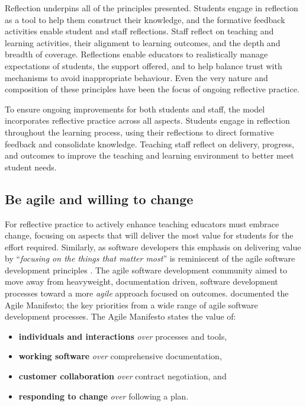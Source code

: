 Reflection underpins all of the principles presented. Students engage in reflection as a tool to help them construct their knowledge, and the formative feedback activities enable student and staff reflections. Staff reflect on teaching and learning activities, their alignment to learning outcomes, and the depth and breadth of coverage. Reflections enable educators to realistically manage expectations of students, the support offered, and to help balance trust with mechanisms to avoid inappropriate behaviour. Even the very nature and composition of these principles have been the focus of ongoing reflective practice.

To ensure ongoing improvements for both students and staff, the model incorporates reflective practice across all aspects. Students engage in reflection throughout the learning process, using their reflections to direct formative feedback and consolidate knowledge. Teaching staff reflect on delivery, progress, and outcomes to improve the teaching and learning environment to better meet student needs.



\subsection{Be agile and willing to change} %
\label{ssub:be_agile_and_willing_to_change}

For reflective practice to actively enhance teaching educators must embrace change, focusing on aspects that will deliver the most value for students for the effort required. Similarly, as software developers this emphasis on delivering value by ``\emph{focusing on the things that matter most}'' is reminiscent of the agile software development principles \cite{Martin:2003}. The agile software development community aimed to move away from heavyweight, documentation driven, software development processes toward a more \emph{agile} approach focused on outcomes. \citet{Beck:2001} documented the Agile Manifesto; the key priorities from a wide range of agile software development processes. The Agile Manifesto states the value of: 

\begin{itemize}[noitemsep,nolistsep]
	\item \textbf{individuals and interactions} \emph{over} processes and tools,
	\item \textbf{working software} \emph{over} comprehensive documentation,
	\item \textbf{customer collaboration} \emph{over} contract negotiation, and
	\item \textbf{responding to change} \emph{over} following a plan.
\end{itemize}

